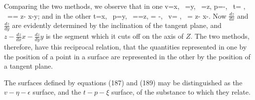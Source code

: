 \documentclass[12pt]{memoir}
\begin{document}
Comparing the two methods, we observe that in one
\eqs v=x, \ \eta=y, \ \epsilon=z,   \label{187}\eqe
\eqs p=-, \ t= , \ \mu=\xi= z- x-y;  \label{188}\eqe
and in the other
\eqs  t=x, \ p=y, \ \mu =\xi=z,  \label{189}\eqe
\eqs \eta = -, \ v= , \ \epsilon= z- x-.  \label{190}\eqe
Now $\frac{d z}{d x}$ and $\frac{d z}{d y}$ are evidently determined by the inclination of the tangent plane, and $z- \frac{d   z}{d   x}x-\frac{d   z}{d   y}y$ is the segment which it cuts off on the axis of $Z$. The two methods, therefore, have this reciprocal relation, that the quantities represented in one by the position of a point in a surface are represented in the other by the position of a tangent plane.


The surfaces defined by equations (187) and (189) may be distinguished as the $v\!-\eta\!-\epsilon$ surface, and the $t\!-p\!-\xi$ surface, of the substance to which they relate.
\end{document}
